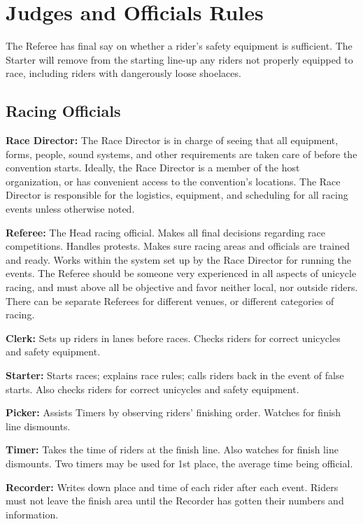 \chapter{Judges and Officials Rules}

The Referee has final say on whether a rider’s safety equipment is sufficient. The Starter will remove from the starting line-up any riders not properly equipped to race, including riders with dangerously loose shoelaces. 

\section{Racing Officials}
\textbf{Race Director:} The Race Director is in charge of seeing that all equipment, forms, people, sound systems, and other requirements are taken care of before the convention starts.
Ideally, the Race Director is a member of the host organization, or has convenient access to the convention's locations.
The Race Director is responsible for the logistics, equipment, and scheduling for all racing events unless otherwise noted.

\textbf{Referee:} The Head racing official.
Makes all final decisions regarding race competitions.
Handles protests.
Makes sure racing areas and officials are trained and ready.
Works within the system set up by the Race Director for running the events.
The Referee should be someone very experienced in all aspects of unicycle racing, and must above all be objective and favor neither local, nor outside riders.
There can be separate Referees for different venues, or different categories of racing.

\textbf{Clerk:} Sets up riders in lanes before races.
Checks riders for correct unicycles and safety equipment.

\textbf{Starter:} Starts races; explains race rules; calls riders back in the event of false starts.
Also checks riders for correct unicycles and safety equipment.

\textbf{Picker:} Assists Timers by observing riders' finishing order.
Watches for finish line dismounts.

\textbf{Timer:} Takes the time of riders at the finish line.
Also watches for finish line dismounts.
Two timers may be used for 1st place, the average time being official.

\textbf{Recorder:} Writes down place and time of each rider after each event.
Riders must not leave the finish area until the Recorder has gotten their numbers and information.


